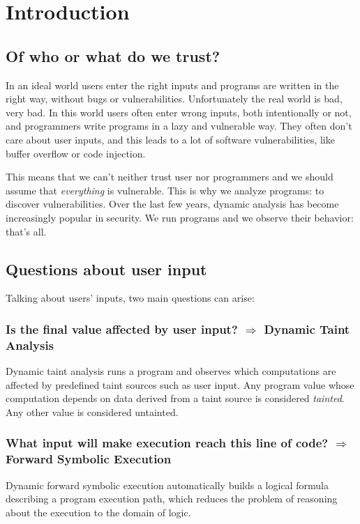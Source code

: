 \section{Introduction}
\subsection{Of who or what do we trust?} 
In an ideal world users enter the right inputs and programs are written in the right way, without bugs or vulnerabilities. Unfortunately the real world is bad, very bad. In this world users often enter wrong inputs, both intentionally or not, and programmers write programs in a lazy and vulnerable way. They often don't care about user inputs, and this leads to a lot of software vulnerabilities, like buffer overflow or code injection.

This means that we can't neither trust user nor programmers and we should assume that \textit{everything} is vulnerable. This is why we analyze programs: to discover vulnerabilities. Over the last few years, dynamic analysis has become increasingly popular in security. We run programs and we observe their behavior: that's all.

\subsection{Questions about user input}
Talking about users' inputs, two main questions can arise:

\subsubsection{Is the final value affected by user input? $\Rightarrow$ Dynamic Taint Analysis}
Dynamic taint analysis runs a program and observes which computations are affected by predefined taint sources such as user input. Any program value whose computation depends on data derived from a taint source is considered \textit{tainted}. Any other value is considered untainted.

\subsubsection{What input will make execution reach this line of code? $\Rightarrow$ Forward Symbolic Execution}
Dynamic forward symbolic execution automatically builds a logical formula describing a program execution path, which reduces the problem of reasoning about the execution to the domain of logic.

